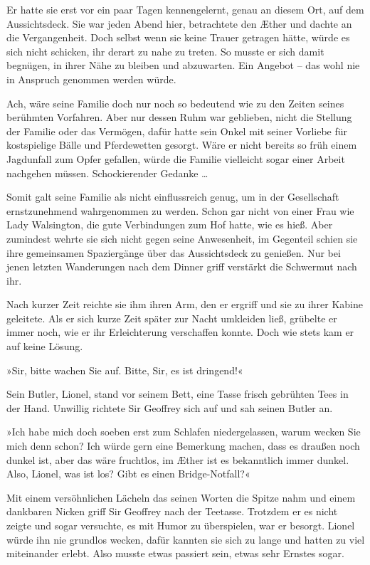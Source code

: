 Er hatte sie erst vor ein paar Tagen kennengelernt, genau an diesem
Ort, auf dem Aussichtsdeck. Sie war jeden Abend hier, betrachtete
den Æther und dachte an die Vergangenheit. Doch selbst wenn sie
keine Trauer getragen hätte, würde es sich nicht schicken, ihr
derart zu nahe zu treten. So musste er sich damit begnügen, in
ihrer Nähe zu bleiben und abzuwarten. Ein Angebot – das wohl nie in
Anspruch genommen werden würde.

Ach, wäre seine Familie doch nur noch so bedeutend wie zu den
Zeiten seines berühmten Vorfahren. Aber nur dessen Ruhm war
geblieben, nicht die Stellung der Familie oder das Vermögen, dafür
hatte sein Onkel mit seiner Vorliebe für kostspielige Bälle und
Pferdewetten gesorgt. Wäre er nicht bereits so früh einem
Jagdunfall zum Opfer gefallen, würde die Familie vielleicht sogar
einer Arbeit nachgehen müssen. Schockierender Gedanke …

Somit galt seine Familie als nicht einflussreich genug, um in der
Gesellschaft ernstzunehmend wahrgenommen zu werden. Schon gar nicht
von einer Frau wie Lady Walsington, die gute Verbindungen zum Hof
hatte, wie es hieß. Aber zumindest wehrte sie sich nicht gegen
seine Anwesenheit, im Gegenteil schien sie ihre gemeinsamen
Spaziergänge über das Aussichtsdeck zu genießen. Nur bei jenen
letzten Wanderungen nach dem Dinner griff verstärkt die Schwermut
nach ihr.

Nach kurzer Zeit reichte sie ihm ihren Arm, den er ergriff und sie
zu ihrer Kabine geleitete. Als er sich kurze Zeit später zur Nacht
umkleiden ließ, grübelte er immer noch, wie er ihr Erleichterung
verschaffen konnte. Doch wie stets kam er auf keine Lösung.

\tb

»Sir, bitte wachen Sie auf. Bitte, Sir, es ist dringend!«

Sein Butler, Lionel, stand vor seinem Bett, eine Tasse frisch
gebrühten Tees in der Hand. Unwillig richtete Sir Geoffrey sich auf
und sah seinen Butler an.

»Ich habe mich doch soeben erst zum Schlafen niedergelassen, warum
wecken Sie mich denn schon? Ich würde gern eine Bemerkung machen,
dass es draußen noch dunkel ist, aber das wäre fruchtlos, im Æther
ist es bekanntlich immer dunkel. Also, Lionel, was ist los? Gibt es
einen Bridge-Notfall?«

Mit einem versöhnlichen Lächeln das seinen Worten die Spitze nahm
und einem dankbaren Nicken griff Sir Geoffrey nach der Teetasse.
Trotzdem er es nicht zeigte und sogar versuchte, es mit Humor zu
überspielen, war er besorgt. Lionel würde ihn nie grundlos wecken,
dafür kannten sie sich zu lange und hatten zu viel miteinander
erlebt. Also musste etwas passiert sein, etwas sehr Ernstes sogar.

